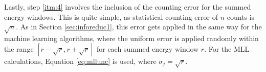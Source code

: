 Lastly, step \ref{itm:4} involves the inclusion of the counting error for the
summed energy windows. This is quite simple, as statistical counting error of
$n$ counts is $\sqrt{n}$.  As in Section \ref{sec:inforeduc1}, this error gets
applied in the same way for the machine learning algorithms, where the uniform
error is applied randomly within the range $[r-\sqrt{r},r+\sqrt{r}]$ for each
summed energy window $r$. For the \gls{MLL} calculations, Equation
\ref{eq:mllunc} is used, where $\sigma_{j} = \sqrt{r}$.  
